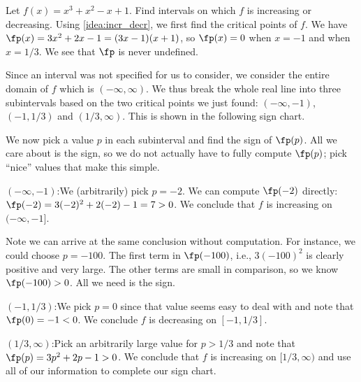 \begin{example}\label{ex_incr1}
Let $f(x) = x^3+x^2-x+1$. Find intervals on which $f$ is increasing or decreasing.
\solution
Using \autoref{idea:incr_decr}, we first find the critical points of $f$. We have $\fp(x) = 3x^2+2x-1 = (3x-1)(x+1)$, so $\fp(x) = 0$ when $x=-1$ and when $x=1/3$. We see that $\fp$ is never undefined.

Since an interval was not specified for us to consider, we consider the entire domain of $f$ which is $(-\infty,\infty)$. We thus break the whole real line into three subintervals based on the two critical points we just found: $(-\infty,-1)$, $(-1,1/3)$ and $(1/3,\infty)$. This is shown in the following sign chart.

\begin{center}
\end{center}

We now pick a value $p$ in each subinterval and find the sign of $\fp(p)$. All we care about is the sign, so we do not actually have to fully compute $\fp(p)$; pick ``nice'' values that make this simple.

\iflatexml\begin{description}\else\begin{description}[leftmargin=0pt]\fi
\item[Subinterval 1,] $(-\infty,-1)$:\quad We (arbitrarily) pick $p=-2$. We can compute $\fp(-2)$ directly: $\fp(-2) = 3(-2)^2+2(-2)-1=7>0$. We conclude that $f$ is increasing on $(-\infty,-1]$.

Note we can arrive at the same conclusion without computation. For instance, we could choose $p=-100$. The first term in $\fp(-100)$, i.e., $3(-100)^2$ is clearly positive and very large. The other terms are small in comparison, so we know $\fp(-100)>0$. All we need is the sign.

\item[Subinterval 2,] $(-1,1/3)$:\quad We pick $p=0$ since that value seems easy to deal with and note that $\fp(0)=-1<0$. We conclude $f$ is decreasing on $[-1,1/3]$.

\item[Subinterval 3,] $(1/3,\infty)$:\quad Pick an arbitrarily large value for $p>1/3$ and note that $\fp(p)=3p^2+2p-1>0$. We conclude that $f$ is increasing on $[1/3,\infty)$ and use all of our information to complete our sign chart.
\end{description}


\end{description}
\end{example}
